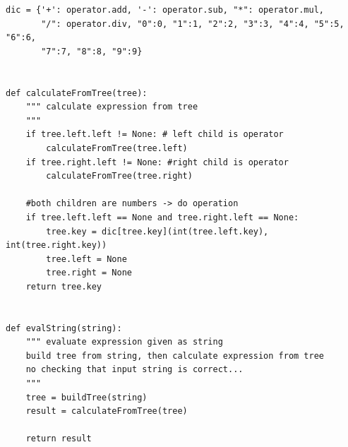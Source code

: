 \documentclass[a4paper]{article}
\begin{document}
\begin{verbatim}
dic = {'+': operator.add, '-': operator.sub, "*": operator.mul, 
       "/": operator.div, "0":0, "1":1, "2":2, "3":3, "4":4, "5":5, "6":6,
       "7":7, "8":8, "9":9}


def calculateFromTree(tree):
    """ calculate expression from tree
    """
    if tree.left.left != None: # left child is operator
        calculateFromTree(tree.left)
    if tree.right.left != None: #right child is operator
        calculateFromTree(tree.right)

    #both children are numbers -> do operation
    if tree.left.left == None and tree.right.left == None:                    
        tree.key = dic[tree.key](int(tree.left.key), int(tree.right.key))
        tree.left = None
        tree.right = None
    return tree.key


def evalString(string):
    """ evaluate expression given as string
    build tree from string, then calculate expression from tree
    no checking that input string is correct...
    """
    tree = buildTree(string)
    result = calculateFromTree(tree)

    return result
\end{verbatim}


\end{document}
